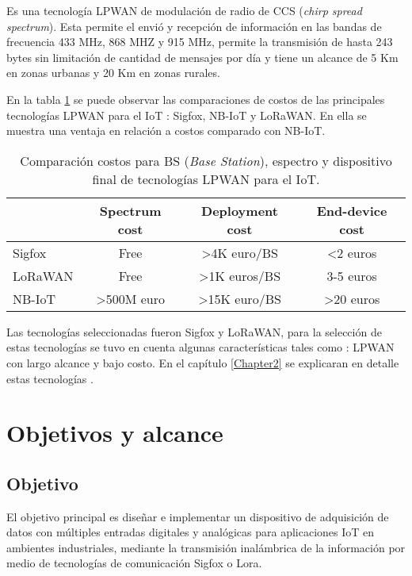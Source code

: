 Es una tecnología LPWAN de modulación de radio de CCS (\textit{chirp spread spectrum}). Esta permite el envió y recepción de información en las bandas de frecuencia 433 MHz, 868 MHZ y 915 MHz, permite la transmisión de hasta 243 bytes sin limitación de cantidad de mensajes por día y tiene un alcance de 5 Km en zonas urbanas y 20 Km en zonas rurales\citep{MEKKI20191}.

En la tabla \ref{tab:Comparacion1Tabla} se puede observar las comparaciones de costos de las principales tecnologías LPWAN para el IoT : Sigfox, NB-IoT y LoRaWAN. En ella se muestra una ventaja en relación a costos comparado con NB-IoT\citep{mekki2018overview}.

\begin{table}[h]
    \small
	\centering
	\caption[Comparación costos.]{Comparación costos para BS (\textit{Base Station}), espectro y dispositivo final de tecnologías LPWAN para el IoT.}
	\begin{tabular}{l c c c}    
		\toprule
		\textbf{ } 	   & \textbf{Spectrum cost} & \textbf{Deployment cost} 	& \textbf{End-device cost}\\
		\midrule
		Sigfox 	    &Free &>4K euro/BS &<2 euros\\	
 		LoRaWAN 	&Free  &>1K euros/BS &3-5 euros\\
        NB-IoT      &>500M euro &>15K euro/BS &>20 euros\\
		\bottomrule
		\hline
	\end{tabular}
	\label{tab:Comparacion1Tabla}
\end{table}

Las tecnologías seleccionadas fueron Sigfox y LoRaWAN, para la selección de estas tecnologías se tuvo en cuenta algunas características tales como : LPWAN con largo alcance\citep{Samie:2016:ITE:2968456.2974004} y bajo costo\citep{mekki2018overview}. En el capítulo \ref{Chapter2} se explicaran en detalle estas tecnologías .


\section{Objetivos y alcance}

\subsection{Objetivo}
El objetivo principal es diseñar e implementar un dispositivo de adquisición de datos con múltiples entradas digitales y analógicas para aplicaciones IoT en ambientes industriales, mediante la transmisión inalámbrica de la información por medio de tecnologías de comunicación Sigfox o Lora. 

